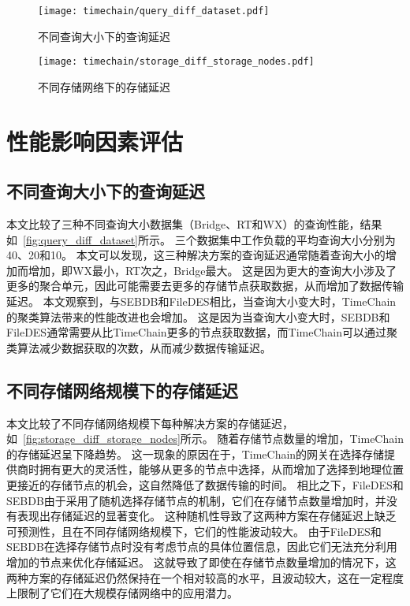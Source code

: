 \begin{figure}[t]
    \centering
	\begin{minipage}{0.45\linewidth}
        \centering
        \texttt{[image: timechain/query\_diff\_dataset.pdf]}
        \caption{不同查询大小下的查询延迟}
        \label{fig:query_diff_dataset}
	\end{minipage}
	\quad
	\begin{minipage}{0.45\linewidth}
        \centering
        \texttt{[image: timechain/storage\_diff\_storage\_nodes.pdf]}
        \caption{不同存储网络下的存储延迟}
        \label{fig:storage_diff_storage_nodes}
    \end{minipage}
\end{figure}

\section{性能影响因素评估}
\subsection{不同查询大小下的查询延迟}
本文比较了三种不同查询大小数据集（Bridge、RT和WX）的查询性能，结果如~\autoref{fig:query_diff_dataset}所示。
三个数据集中工作负载的平均查询大小分别为40、20和10。
本文可以发现，这三种解决方案的查询延迟通常随着查询大小的增加而增加，即WX最小，RT次之，Bridge最大。
这是因为更大的查询大小涉及了更多的聚合单元，因此可能需要去更多的存储节点获取数据，从而增加了数据传输延迟。
本文观察到，与SEBDB和FileDES相比，当查询大小变大时，TimeChain的聚类算法带来的性能改进也会增加。
这是因为当查询大小变大时，SEBDB和FileDES通常需要从比TimeChain更多的节点获取数据，而TimeChain可以通过聚类算法减少数据获取的次数，从而减少数据传输延迟。

\subsection{不同存储网络规模下的存储延迟}
本文比较了不同存储网络规模下每种解决方案的存储延迟，如~\autoref{fig:storage_diff_storage_nodes}所示。
随着存储节点数量的增加，TimeChain的存储延迟呈下降趋势。
这一现象的原因在于，TimeChain的网关在选择存储提供商时拥有更大的灵活性，能够从更多的节点中选择，从而增加了选择到地理位置更接近的存储节点的机会，这自然降低了数据传输的时间。
相比之下，FileDES和SEBDB由于采用了随机选择存储节点的机制，它们在存储节点数量增加时，并没有表现出存储延迟的显著变化。
这种随机性导致了这两种方案在存储延迟上缺乏可预测性，且在不同存储网络规模下，它们的性能波动较大。
由于FileDES和SEBDB在选择存储节点时没有考虑节点的具体位置信息，因此它们无法充分利用增加的节点来优化存储延迟。
这就导致了即使在存储节点数量增加的情况下，这两种方案的存储延迟仍然保持在一个相对较高的水平，且波动较大，这在一定程度上限制了它们在大规模存储网络中的应用潜力。

